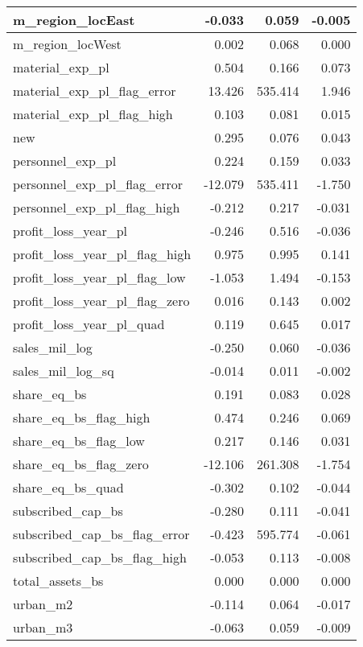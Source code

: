 \begin{table}
\begin{tabular}[t]{l|r|r|r}
\hline
m\_region\_locEast & -0.033 & 0.059 & -0.005\\
\hline
m\_region\_locWest & 0.002 & 0.068 & 0.000\\
\hline
material\_exp\_pl & 0.504 & 0.166 & 0.073\\
\hline
material\_exp\_pl\_flag\_error & 13.426 & 535.414 & 1.946\\
\hline
material\_exp\_pl\_flag\_high & 0.103 & 0.081 & 0.015\\
\hline
new & 0.295 & 0.076 & 0.043\\
\hline
personnel\_exp\_pl & 0.224 & 0.159 & 0.033\\
\hline
personnel\_exp\_pl\_flag\_error & -12.079 & 535.411 & -1.750\\
\hline
personnel\_exp\_pl\_flag\_high & -0.212 & 0.217 & -0.031\\
\hline
profit\_loss\_year\_pl & -0.246 & 0.516 & -0.036\\
\hline
profit\_loss\_year\_pl\_flag\_high & 0.975 & 0.995 & 0.141\\
\hline
profit\_loss\_year\_pl\_flag\_low & -1.053 & 1.494 & -0.153\\
\hline
profit\_loss\_year\_pl\_flag\_zero & 0.016 & 0.143 & 0.002\\
\hline
profit\_loss\_year\_pl\_quad & 0.119 & 0.645 & 0.017\\
\hline
sales\_mil\_log & -0.250 & 0.060 & -0.036\\
\hline
sales\_mil\_log\_sq & -0.014 & 0.011 & -0.002\\
\hline
share\_eq\_bs & 0.191 & 0.083 & 0.028\\
\hline
share\_eq\_bs\_flag\_high & 0.474 & 0.246 & 0.069\\
\hline
share\_eq\_bs\_flag\_low & 0.217 & 0.146 & 0.031\\
\hline
share\_eq\_bs\_flag\_zero & -12.106 & 261.308 & -1.754\\
\hline
share\_eq\_bs\_quad & -0.302 & 0.102 & -0.044\\
\hline
subscribed\_cap\_bs & -0.280 & 0.111 & -0.041\\
\hline
subscribed\_cap\_bs\_flag\_error & -0.423 & 595.774 & -0.061\\
\hline
subscribed\_cap\_bs\_flag\_high & -0.053 & 0.113 & -0.008\\
\hline
total\_assets\_bs & 0.000 & 0.000 & 0.000\\
\hline
urban\_m2 & -0.114 & 0.064 & -0.017\\
\hline
urban\_m3 & -0.063 & 0.059 & -0.009\\
\hline
\end{tabular}
\end{table}